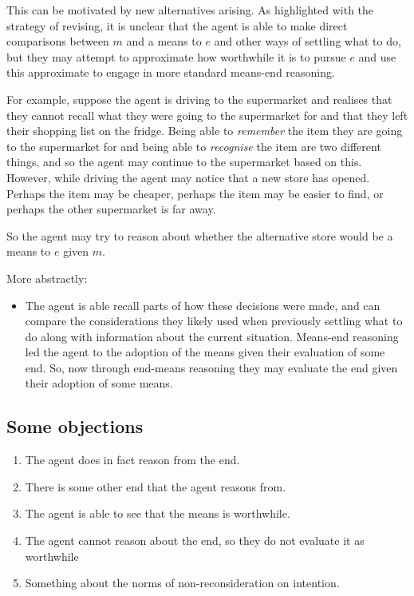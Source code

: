 \documentclass[10pt]{article}
\newcommand{\hozline}[0]{%
  \noindent\hdashrule[0.5ex][c]{\textwidth}{.1pt}{}
}
\begin{document}
This can be motivated by new alternatives arising.
As highlighted with the strategy of revising, it is unclear that the agent is able to make direct comparisons between \(m\) and a means to \(e\) and other ways of settling what to do, but they may attempt to approximate how worthwhile it is to pursue \(e\) and use this approximate to engage in more standard means-end reasoning.

For example, suppose the agent is driving to the supermarket and realises that they cannot recall what they were going to the supermarket for and that they left their shopping list on the fridge.
Being able to \emph{remember} the item they are going to the supermarket for and being able to \emph{recognise} the item are two different things, and so the agent may continue to the supermarket based on this.
However, while driving the agent may notice that a new store has opened.
Perhaps the item may be cheaper, perhaps the item may be easier to find, or perhaps the other supermarket is far away.

So the agent may try to reason about whether the alternative store would be a means to \(e\) given \(m\).

\mbox{}

\noindent More abstractly:

\begin{itemize}[label=]
\item The agent is able recall parts of how these decisions were made, and can compare the considerations they likely used when previously settling what to do along with information about the current situation. Means-end reasoning led the agent to the adoption of the means given their evaluation of some end. So, now through end-means reasoning they may evaluate the end given their adoption of some means.
\end{itemize}


\newpage


\newpage

\subsection*{Some objections}
\label{sec:some-objections}

\hozline

\begin{enumerate}[label=\alph*)]
\item The agent does in fact reason from the end.
\item There is some other end that the agent reasons from.
\item The agent is able to see that the means is worthwhile.
\item The agent cannot reason about the end, so they do not evaluate it as worthwhile
\item Something about the norms of non-reconsideration on intention.
\end{enumerate}
\end{document}
